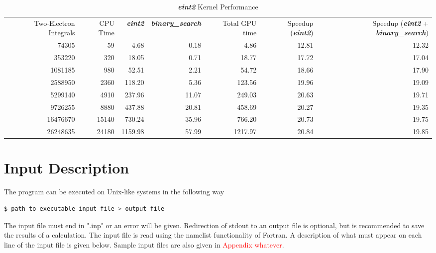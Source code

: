\documentclass[12pt]{report}
\newcommand{\notetodylan}[1]{\textcolor{red}{#1}} %
\newcommand{\kernel}[1]{\textit{\textbf{#1}}}
\begin{document}
\begin{table}[h]
\caption{\kernel{eint2} Kernel Performance}
\label{tab:2eintprof}
\begin{tabular}{rrrrrrr}
	\multirow{4}{2cm}{Two-Electron Integrals}	&	\multirow{4}{*}{CPU Time}		&	\multirow{4}{*}{\kernel{eint2}}	&	\multirow{4}{2.4cm}{\kernel{binary\_search}}		&	\multirow{4}{1cm}{Total GPU time}	&	\multirow{4}{1.5cm}{Speedup (\kernel{eint2})}	&	\multirow{4}{2cm}{Speedup (\kernel{eint2} + \kernel{binary\_search})}	\\
	\\
	\\
	\\
	\hline
	74305	&	59		&	4.68		&	0.18		&	4.86		&	12.81	&	12.32	\\
	353220	&	320		&	18.05	&	0.71		&	18.77	&	17.72	&	17.04	\\
	1081185	&	980		&	52.51	&	2.21		&	54.72	&	18.66	&	17.90	\\
	2588950	&	2360		&	118.20	&	5.36		&	123.56	&	19.96	&	19.09	\\
	5299140	&	4910		&	237.96	&	11.07	&	249.03	&	20.63	&	19.71	\\
	9726255	&	8880		&	437.88	&	20.81	&	458.69	&	20.27	&	19.35	\\
	16476670	&	15140	&	730.24	&	35.96	&	766.20	&	20.73	&	19.75	\\
	26248635	&	24180	&	1159.98	&	57.99	&	1217.97	&	20.84	&	19.85	\\
\end{tabular}
\end{table}


\section{Input Description}\label{inp_des}
The program can be executed on Unix-like systems in the following way
\begin{lstlisting}[language=bash]
	$ path_to_executable input_file > output_file
\end{lstlisting}

The input file must end in ".inp" or an error will be given. Redirection of stdout to an output file is optional, but is recommended to save the results of a calculation. The input file is read using the namelist functionality of Fortran. A description of what must appear on each line of the input file is given below. Sample input files are also given in \notetodylan{Appendix whatever}.
\end{document}
